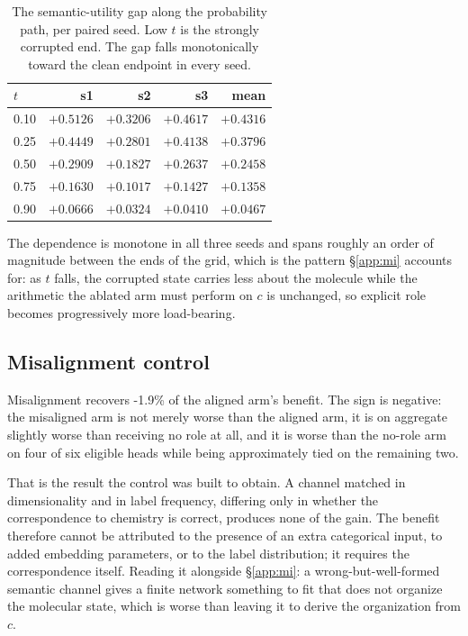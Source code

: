 \documentclass{article}
\newcounter{none}
\newcommand{\MisalignRecovered}{-1.9\%}       %
\newcommand{\MisalignWorseHeads}{four of six} %
\begin{document}
\begin{table}[h]
\centering
\caption{The semantic-utility gap along the probability path, per paired seed. Low $t$ is the
strongly corrupted end. The gap falls monotonically toward the clean endpoint in every seed.}
\label{tab:sem-by-t}
\small
\begin{tabular}{@{}lrrrr@{}}
\toprule
$t$ & s1 & s2 & s3 & mean \\
\midrule
0.10 & $+0.5126$ & $+0.3206$ & $+0.4617$ & $+0.4316$ \\
0.25 & $+0.4449$ & $+0.2801$ & $+0.4138$ & $+0.3796$ \\
0.50 & $+0.2909$ & $+0.1827$ & $+0.2637$ & $+0.2458$ \\
0.75 & $+0.1630$ & $+0.1017$ & $+0.1427$ & $+0.1358$ \\
0.90 & $+0.0666$ & $+0.0324$ & $+0.0410$ & $+0.0467$ \\
\bottomrule
\end{tabular}
\end{table}

The dependence is monotone in all three seeds and spans roughly an order of magnitude between the
ends of the grid, which is the pattern \S\ref{app:mi} accounts for: as $t$ falls, the corrupted state
carries less about the molecule while the arithmetic the ablated arm must perform on $c$ is
unchanged, so explicit role becomes progressively more load-bearing.

\subsection{Misalignment control}
\label{app:misalign}
Misalignment recovers \MisalignRecovered{} of the aligned arm's benefit. The sign is negative: the
misaligned arm is not merely worse than the aligned arm, it is on aggregate slightly worse than
receiving no role at all, and it is worse than the no-role arm on \MisalignWorseHeads{} eligible
heads while being approximately tied on the remaining two.

That is the result the control was built to obtain. A channel matched in dimensionality and in label
frequency, differing only in whether the correspondence to chemistry is correct, produces none of the
gain. The benefit therefore cannot be attributed to the presence of an extra categorical input, to
added embedding parameters, or to the label distribution; it requires the correspondence itself.
Reading it alongside \S\ref{app:mi}: a wrong-but-well-formed semantic channel gives a finite network
something to fit that does not organize the molecular state, which is worse than leaving it to derive
the organization from $c$.
\end{document}
